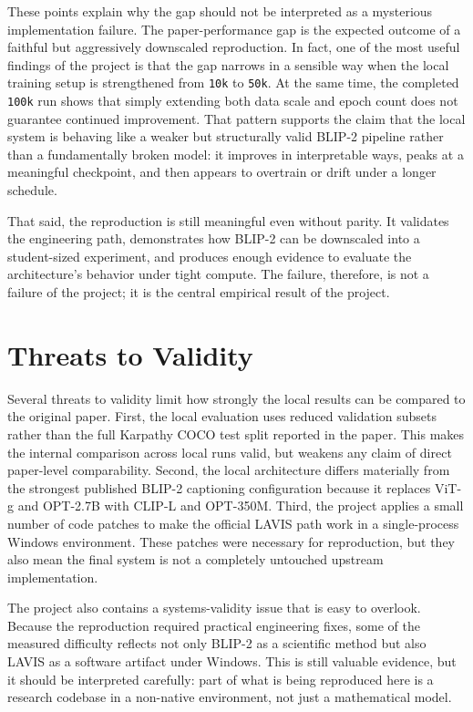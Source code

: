 \documentclass[11pt]{article}
\begin{document}
These points explain why the gap should not be interpreted as a mysterious implementation failure. The paper-performance gap is the expected outcome of a faithful but aggressively downscaled reproduction. In fact, one of the most useful findings of the project is that the gap narrows in a sensible way when the local training setup is strengthened from \texttt{10k} to \texttt{50k}. At the same time, the completed \texttt{100k} run shows that simply extending both data scale and epoch count does not guarantee continued improvement. That pattern supports the claim that the local system is behaving like a weaker but structurally valid BLIP-2 pipeline rather than a fundamentally broken model: it improves in interpretable ways, peaks at a meaningful checkpoint, and then appears to overtrain or drift under a longer schedule.

That said, the reproduction is still meaningful even without parity. It validates the engineering path, demonstrates how BLIP-2 can be downscaled into a student-sized experiment, and produces enough evidence to evaluate the architecture's behavior under tight compute. The failure, therefore, is not a failure of the project; it is the central empirical result of the project.

\section{Threats to Validity}
Several threats to validity limit how strongly the local results can be compared to the original paper. First, the local evaluation uses reduced validation subsets rather than the full Karpathy COCO test split reported in the paper. This makes the internal comparison across local runs valid, but weakens any claim of direct paper-level comparability. Second, the local architecture differs materially from the strongest published BLIP-2 captioning configuration because it replaces ViT-g and OPT-2.7B with CLIP-L and OPT-350M. Third, the project applies a small number of code patches to make the official LAVIS path work in a single-process Windows environment. These patches were necessary for reproduction, but they also mean the final system is not a completely untouched upstream implementation.

The project also contains a systems-validity issue that is easy to overlook. Because the reproduction required practical engineering fixes, some of the measured difficulty reflects not only BLIP-2 as a scientific method but also LAVIS as a software artifact under Windows. This is still valuable evidence, but it should be interpreted carefully: part of what is being reproduced here is a research codebase in a non-native environment, not just a mathematical model.
\end{document}
